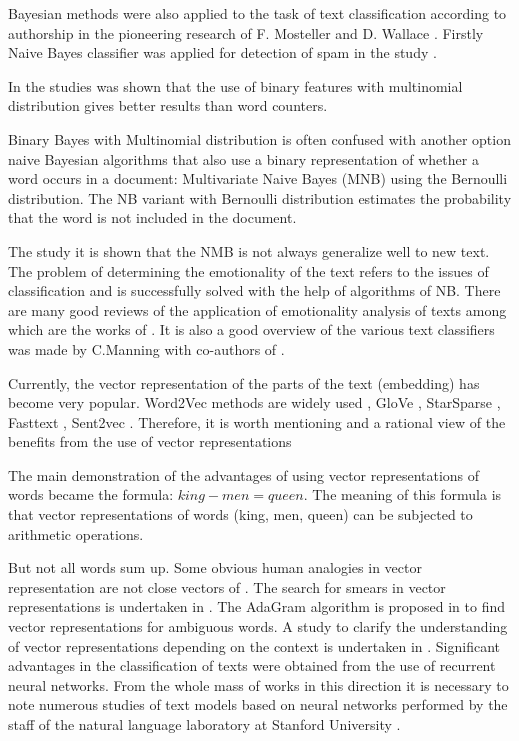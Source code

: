 \documentclass[12pt]{report}
\theoremstyle{definition}
\begin{document}
Bayesian methods \cite{bayes1763essay} were also applied to the task of text classification according to authorship in the pioneering research of F. Mosteller and D. Wallace \cite{mosteller1963inference}. 
Firstly Naive Bayes classifier was applied for detection of spam in the study \cite{sahami1998bayesian}.

In the studies \cite{metsis2006spam, wang2012baselines, pang2002thumbs} was shown that the use of binary features with multinomial distribution gives better results than word counters. 

Binary Bayes with Multinomial distribution is often confused with another option naive Bayesian algorithms that also use a binary representation of whether a word occurs in a document: 
Multivariate Naive Bayes (MNB) using the Bernoulli distribution. 
The NB variant with Bernoulli distribution estimates the probability that the word is not included in the document.

The study \cite{mccallum1998comparison} it is shown that the NMB is not always generalize well to new text.
The problem of determining the emotionality of the text refers to the issues of classification and is successfully solved with the help of algorithms of NB.  
There are many good reviews of the application of emotionality analysis of texts among which are the works of \cite{pang2008opinion, liu2012survey, stamatatos2009survey}.
It is also a good overview of the various text classifiers was made by C.Manning with co-authors of \cite{schutze2008introduction}.

Currently, the vector representation of the parts of the text (embedding)  has become very popular.
Word2Vec methods are widely used \cite{mikolov2013efficient}, GloVe \cite{pennington2014glove}, StarSparse \cite{wu2017starspace}, Fasttext \cite{bojanowski2016enriching}, Sent2vec \cite{pagliardini2017unsupervised}. 
Therefore, it is worth mentioning and a rational view of the benefits from the use of vector representations

The main demonstration of the advantages of using vector representations of words became the formula: $ king - men = queen$.
The meaning of this formula is that vector representations of words (king, men, queen) can be subjected to arithmetic operations.

But not all words sum up. Some obvious human analogies in vector representation are not close vectors of \cite{finley2017analogies}.
The search for smears in vector representations is undertaken in \cite{pelevina2017making, panchenko2017unsupervised}.
The AdaGram algorithm is proposed in \cite{bartunov2016breaking} to find vector representations for ambiguous words.
A study to clarify the understanding of vector representations depending on the context is undertaken in \cite{huang2012improving,gladkova2016intrinsic}. 
Significant advantages in the classification of texts were obtained from the use of recurrent neural networks. 
From the whole mass of works in this direction it is necessary to note numerous studies of text models based on neural networks performed by the staff of the natural language laboratory at Stanford University \cite{schuster2018gapping,eric2017copy,wang2017naturalizing,li2017adversarial,xie2017data}.
\end{document}

